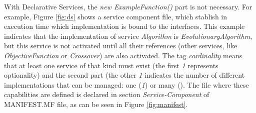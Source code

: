 \documentclass{sig-alternate}
\begin{document}
With Declarative Services, the {\em new ExampleFunction()} part is not necessary. For example, Figure \ref{fig:ds} shows a service component file, which stablish in execution time which implementation is bound to the interfaces. This example indicates that the implementation of service {\em Algorithm} is {\em EvolutionaryAlgorithm}, but this service is not activated until all their references (other services, like {\em ObjectiveFunction} or {\em Crossover}) are also activated. The tag {\em cardinality} means that at least one service of that kind must exist (the first {\em 1} represents optionality) and  the second part (the other {\em 1} indicates the number of different implementations that can be managed: one ({\em 1}) or many ({\em *}). The file where these capabilities are defined is declared in section {\em Service-Component} of MANIFEST.MF file, as can be seen in Figure \ref{fig:manifest}.
\end{document}
